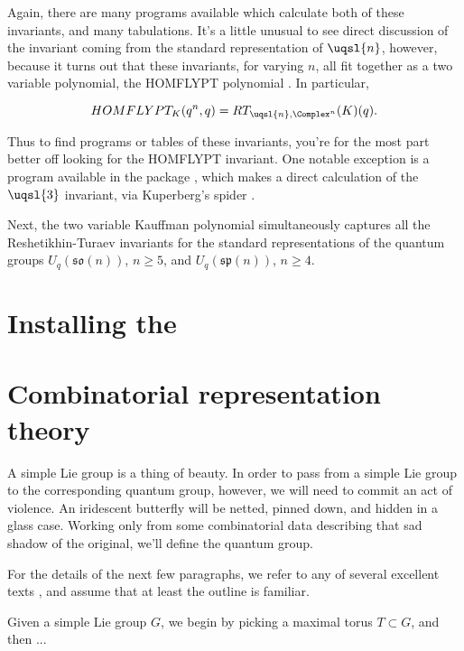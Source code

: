 Again, there are many programs available which calculate both of these
invariants, and many tabulations. It's a little unusual to see direct
discussion of the invariant coming from the standard representation of
$\uqsl{n}$, however, because it turns out that these invariants, for
varying $n$, all fit together as a two variable polynomial, the HOMFLYPT
polynomial \cite{???}. In particular,

$$HOMFLYPT_K(q^n, q) = RT_{\uqsl{n}, \Complex^n}(K)(q).$$

Thus to find programs or tables of these invariants, you're for the most
part better off looking for the HOMFLYPT invariant. One notable exception
is a program available in the  \MMA package \cite{???},
which makes a direct calculation of the $\uqsl{3}$ invariant, via
Kuperberg's spider \cite{???}.

Next, the two variable Kauffman polynomial simultaneously captures all
the Reshetikhin-Turaev invariants for the standard representations of the
quantum groups $U_q(\mathfrak{so}(n))$, $n \geq 5$, and
$U_q(\mathfrak{sp}(n))$, $n \geq 4$.

 


\section{Installing the \pkg}

\section{Combinatorial representation theory}
A simple Lie group is a thing of beauty. In order to pass from a simple Lie group to the corresponding quantum group, however, we will need to commit
an act of violence. An iridescent butterfly will be netted, pinned down, and hidden in a glass case. Working only from some combinatorial data
describing that sad shadow of the original, we'll define the quantum group.

For the details of the next few paragraphs, we refer to any of several excellent texts \cite{?,?,?}, and assume that at least the outline is familiar.

Given a simple Lie group $G$, we begin by picking a maximal torus $T \subset G$, and then ...

